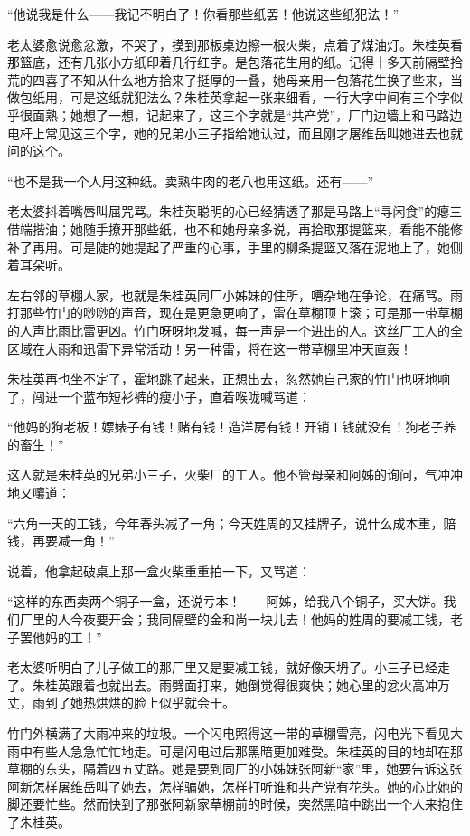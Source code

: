 \par “他说我是什么——我记不明白了！你看那些纸罢！他说这些纸犯法！”
\par 老太婆愈说愈忿激，不哭了，摸到那板桌边擦一根火柴，点着了煤油灯。朱桂英看那篮底，还有几张小方纸印着几行红字。是包落花生用的纸。记得十多天前隔壁拾荒的四喜子不知从什么地方拾来了挺厚的一叠，她母亲用一包落花生换了些来，当做包纸用，可是这纸就犯法么？朱桂英拿起一张来细看，一行大字中间有三个字似乎很面熟；她想了一想，记起来了，这三个字就是“共产党”，厂门边墙上和马路边电杆上常见这三个字，她的兄弟小三子指给她认过，而且刚才屠维岳叫她进去也就问的这个。
\par “也不是我一个人用这种纸。卖熟牛肉的老八也用这纸。还有——”
\par 老太婆抖着嘴唇叫屈咒骂。朱桂英聪明的心已经猜透了那是马路上“寻闲食”的瘪三借端揩油；她随手撩开那些纸，也不和她母亲多说，再拾取那提篮来，看能不能修补了再用。可是陡的她提起了严重的心事，手里的柳条提篮又落在泥地上了，她侧着耳朵听。
\par 左右邻的草棚人家，也就是朱桂英同厂小姊妹的住所，嘈杂地在争论，在痛骂。雨打那些竹门的唦唦的声音，现在是更急更响了，雷在草棚顶上滚；可是那一带草棚的人声比雨比雷更凶。竹门呀呀地发喊，每一声是一个进出的人。这丝厂工人的全区域在大雨和迅雷下异常活动！另一种雷，将在这一带草棚里冲天直轰！
\par 朱桂英再也坐不定了，霍地跳了起来，正想出去，忽然她自己家的竹门也呀地响了，闯进一个蓝布短衫裤的瘦小子，直着喉咙喊骂道：
\par “他妈的狗老板！嫖婊子有钱！赌有钱！造洋房有钱！开销工钱就没有！狗老子养的畜生！”
\par 这人就是朱桂英的兄弟小三子，火柴厂的工人。他不管母亲和阿姊的询问，气冲冲地又嚷道：
\par “六角一天的工钱，今年春头减了一角；今天姓周的又挂牌子，说什么成本重，赔钱，再要减一角！”
\par 说着，他拿起破桌上那一盒火柴重重拍一下，又骂道：
\par “这样的东西卖两个铜子一盒，还说亏本！——阿姊，给我八个铜子，买大饼。我们厂里的人今夜要开会；我同隔壁的金和尚一块儿去！他妈的姓周的要减工钱，老子罢他妈的工！”
\par 老太婆听明白了儿子做工的那厂里又是要减工钱，就好像天坍了。小三子已经走了。朱桂英跟着也就出去。雨劈面打来，她倒觉得很爽快；她心里的忿火高冲万丈，雨到了她热烘烘的脸上似乎就会干。
\par 竹门外横满了大雨冲来的垃圾。一个闪电照得这一带的草棚雪亮，闪电光下看见大雨中有些人急急忙忙地走。可是闪电过后那黑暗更加难受。朱桂英的目的地却在那草棚的东头，隔着四五丈路。她是要到同厂的小姊妹张阿新“家”里，她要告诉这张阿新怎样屠维岳叫了她去，怎样骗她，怎样打听谁和共产党有花头。她的心比她的脚还要忙些。然而快到了那张阿新家草棚前的时候，突然黑暗中跳出一个人来抱住了朱桂英。
